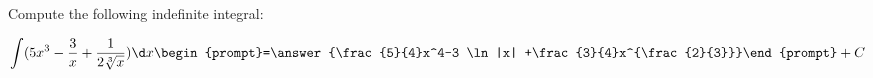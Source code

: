 \documentclass{ximera}
\author{Jim Talamo}
\begin{document}
\begin{exercise}
Compute the following indefinite integral:

\[
\int (5x^3-\frac{3}{x}+\frac{1}{2 \sqrt[3]{x}} ) \d x 
\begin{prompt}=\answer{\frac{5}{4}x^4-3 \ln |x| +\frac{3}{4}x^{\frac{2}{3}}}\end{prompt}+C
\]
\end{exercise}
\end{document}
